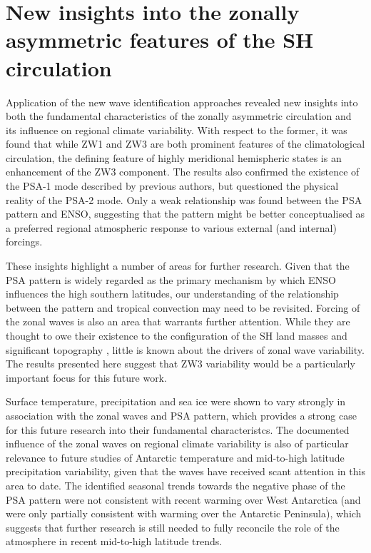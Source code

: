 

\section{New insights into the zonally asymmetric features of the SH circulation}

Application of the new wave identification approaches revealed new insights into both the fundamental characteristics of the zonally asymmetric circulation and its influence on regional climate variability. With respect to the former, it was found that while ZW1 and ZW3 are both prominent features of the climatological circulation, the defining feature of highly meridional hemispheric states is an enhancement of the ZW3 component. The results also confirmed the existence of the PSA-1 mode described by previous authors, but questioned the physical reality of the PSA-2 mode. Only a weak relationship was found between the PSA pattern and ENSO, suggesting that the pattern might be better conceptualised as a preferred regional atmospheric response to various external (and internal) forcings. 

These insights highlight a number of areas for further research. Given that the PSA pattern is widely regarded as the primary mechanism by which ENSO influences the high southern latitudes, our understanding of the relationship between the pattern and tropical convection may need to be revisited. Forcing of the zonal waves is also an area that warrants further attention. While they are thought to owe their existence to the configuration of the SH land masses and significant topography \citep{Baines1989}, little is known about the drivers of zonal wave variability. The results presented here suggest that ZW3 variability would be a particularly important focus for this future work.  

Surface temperature, precipitation and sea ice were shown to vary strongly in association with the zonal waves and PSA pattern, which provides a strong case for this future research into their fundamental characteristcs. The documented influence of the zonal waves on regional climate variability is also of particular relevance to future studies of Antarctic temperature and mid-to-high latitude precipitation variability, given that the waves have received scant attention in this area to date. The identified seasonal trends towards the negative phase of the PSA pattern were not consistent with recent warming over West Antarctica (and were only partially consistent with warming over the Antarctic Peninsula), which suggests that further research is still needed to fully reconcile the role of the atmosphere in recent mid-to-high latitude trends. 

